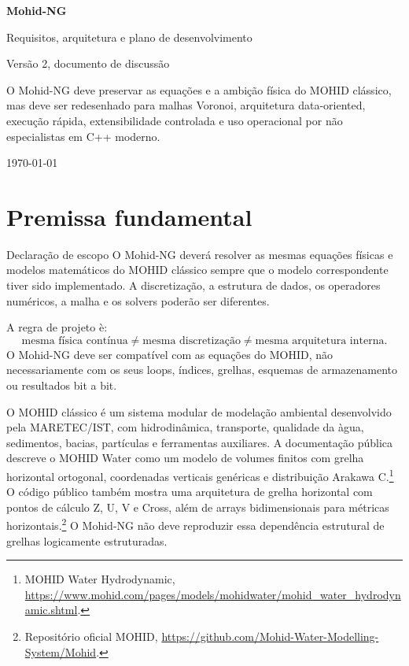 \documentclass[11pt,a4paper]{article}
\begin{document}
\begin{titlepage}
\centering
\vspace*{14mm}
{\Huge\bfseries\color{MohidBlue} Mohid-NG\par}
\vspace{3mm}
{\Large\color{MohidInk} Requisitos, arquitetura e plano de desenvolvimento\par}
\vspace{5mm}
{\large\color{MohidGray} Vers\~ao 2, documento de discuss\~ao\par}
\vfill
\begin{tcolorbox}[colback=MohidBlue!5,width=0.86\textwidth]
\large
O Mohid-NG deve preservar as equa\c{c}\~oes e a ambi\c{c}\~ao f\'isica do MOHID cl\'assico, mas deve ser redesenhado para malhas Voronoi, arquitetura data-oriented, execu\c{c}\~ao r\'apida, extensibilidade controlada e uso operacional por n\~ao especialistas em C++ moderno.
\end{tcolorbox}
\vfill
{\color{MohidGray}\today\par}
\end{titlepage}

\tableofcontents
\newpage

\section{Premissa fundamental}

\begin{principlebox}{Declara\c{c}\~ao de escopo}
O Mohid-NG dever\'a resolver as mesmas equa\c{c}\~oes f\'isicas e modelos matem\'aticos do MOHID cl\'assico sempre que o modelo correspondente tiver sido implementado. A discretiza\c{c}\~ao, a estrutura de dados, os operadores num\'ericos, a malha e os solvers poder\~ao ser diferentes.
\end{principlebox}

A regra de projeto \`e:
\[
\text{mesma f\'isica cont\'inua}\neq\text{mesma discretiza\c{c}\~ao}\neq\text{mesma arquitetura interna}.
\]
O Mohid-NG deve ser compat\'ivel com as equa\c{c}\~oes do MOHID, n\~ao necessariamente com os seus loops, \'{i}ndices, grelhas, esquemas de armazenamento ou resultados bit a bit.

O MOHID cl\'assico \'e um sistema modular de modela\c{c}\~ao ambiental desenvolvido pela MARETEC/IST, com hidrodin\^amica, transporte, qualidade da \`agua, sedimentos, bacias, part\'iculas e ferramentas auxiliares. A documenta\c{c}\~ao p\'ublica descreve o MOHID Water como um modelo de volumes finitos com grelha horizontal ortogonal, coordenadas verticais gen\'ericas e distribui\c{c}\~ao Arakawa C.\footnote{MOHID Water Hydrodynamic, \url{https://www.mohid.com/pages/models/mohidwater/mohid_water_hydrodynamic.shtml}.} O c\'odigo p\'ublico tamb\'em mostra uma arquitetura de grelha horizontal com pontos de c\'alculo Z, U, V e Cross, al\'em de arrays bidimensionais para m\'etricas horizontais.\footnote{Reposit\'orio oficial MOHID, \url{https://github.com/Mohid-Water-Modelling-System/Mohid}.} O Mohid-NG n\~ao deve reproduzir essa depend\^encia estrutural de grelhas logicamente estruturadas.
\end{document}
